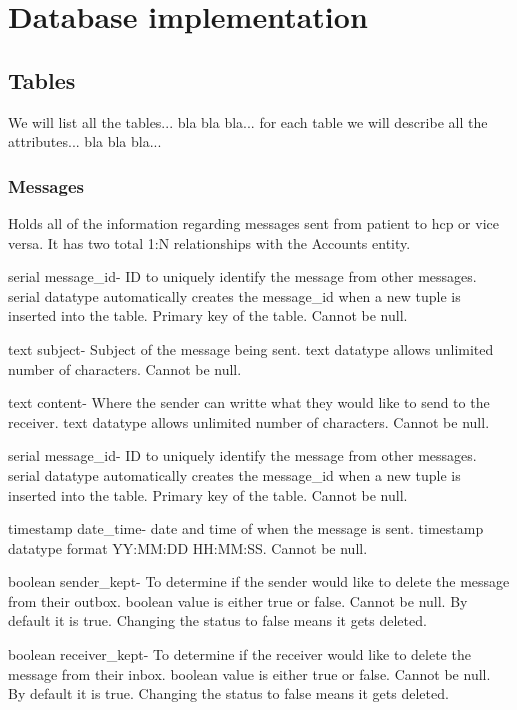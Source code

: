 \documentclass[12pt]{report}
\begin{document}
\section{Database implementation}
\subsection{Tables}
We will list all the tables... bla bla bla... for each table we will describe all the attributes... bla bla bla...

\subsubsection{Messages}
Holds all of the information regarding messages sent from patient to hcp or vice versa. It has two total 1:N relationships with the Accounts entity.

\begin{description}
\item serial message\_id- ID to uniquely identify the message from other messages. serial datatype automatically creates the message\_id when a new tuple is inserted into the table.  Primary key of the table.  Cannot be null.
\item text subject- Subject of the message being sent. text datatype allows unlimited number of characters.  Cannot be null.
\item text content- Where the sender can writte what they would like to send to the receiver.  text datatype allows unlimited number of characters.  Cannot be null.
\item serial message\_id- ID to uniquely identify the message from other messages. serial datatype automatically creates the message\_id when a new tuple is inserted into the table.  Primary key of the table.  Cannot be null.
\item timestamp date\_time- date and time of when the message is sent.  timestamp datatype format YY:MM:DD HH:MM:SS.  Cannot be null.
\item boolean sender\_kept- To determine if the sender would like to delete the message from their outbox.  boolean value is either true or false.  Cannot be null.  By default it is true.  Changing the status to false means it gets deleted.
\item boolean receiver\_kept- To determine if the receiver would like to delete the message from their inbox.  boolean value is either true or false.  Cannot be null.  By default it is true.  Changing the status to false means it gets deleted.
\end{description}
\end{document}
